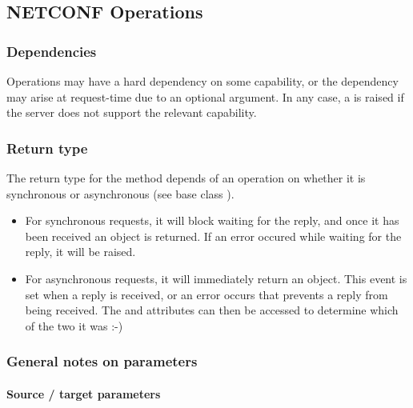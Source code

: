 \documentclass[a4paper,10pt,english]{manual}
\begin{document}
\subsection{NETCONF Operations}


\subsubsection{Dependencies}

Operations may have a hard dependency on some capability, or the dependency may arise at request-time due to an optional argument. In any case, a \hyperlink{ncclient.operations.MissingCapabilityError}{} is raised if the server does not support the relevant capability.
\hypertarget{return}{}

\subsubsection{Return type}

The return type for the  method depends of an operation on whether it is synchronous or asynchronous (see base class ).
\begin{itemize}
\item {} 
For synchronous requests, it will block waiting for the reply, and once it has been received an  object is returned. If an error occured while waiting for the reply, it will be raised.

\item {} 
For asynchronous requests, it will immediately return an \href{http://docs.python.org/library/threading.html\#threading.Event}{} object. This event is set when a reply is received, or an error occurs that prevents a reply from being received. The  and  attributes can then be accessed to determine which of the two it was :-)

\end{itemize}


\subsubsection{General notes on parameters}


\hypertarget{source-target}{}\paragraph{Source / target parameters}
\end{document}
